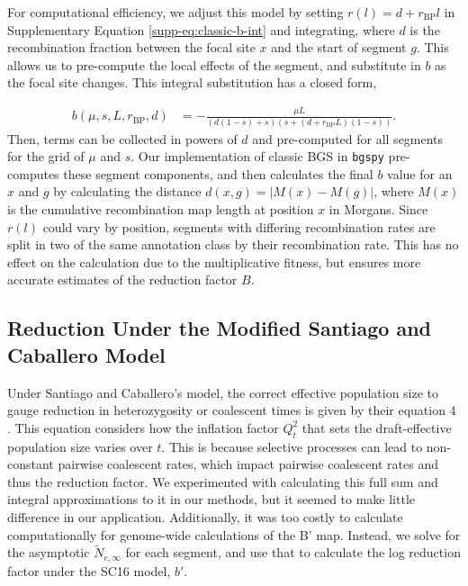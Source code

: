 \documentclass[11pt]{article}
\begin{document}
For computational efficiency, we adjust this model by setting $r(l) = d +
r_\text{BP} l$ in Supplementary Equation \eqref{supp-eq:classic-b-int} and
integrating, where $d$ is the recombination fraction between the focal site $x$
and the start of segment $g$. This allows us to pre-compute the local effects
of the segment, and substitute in $b$ as the focal site changes. This integral
substitution has a closed form,

\begin{align}
  b(\mu, s, L, r_\text{BP}, d) &= - \frac{\mu L}{(d(1-s) + s)(s + (d + r_\text{BP}L)(1-s))}.
\end{align}
%
Then, terms can be collected in powers of $d$ and pre-computed for all segments for
the grid of $\mu$ and $s$. Our implementation of classic BGS in \texttt{bgspy}
pre-computes these segment components, and then calculates the final $b$ value
for an $x$ and $g$ by calculating the distance $d(x,g) = |M(x) - M(g)|$, where
$M(x)$ is the cumulative recombination map length at position $x$ in Morgans.
Since $r(l)$ could vary by position, segments with differing recombination
rates are split in two of the same annotation class by their recombination
rate. This has no effect on the calculation due to the multiplicative fitness,
but ensures more accurate estimates of the reduction factor $B$.


\subsection{Reduction Under the Modified Santiago and Caballero Model}
\label{supp:reduction-sc16}

Under Santiago and Caballero's model, the correct effective population size to
gauge reduction in heterozygosity or coalescent times is given by their
equation 4 \parencite{Santiago2016-mu}. This equation considers how the
inflation factor $Q_t^2$ that sets the draft-effective population size varies
over $t$. This is because selective processes can lead to non-constant pairwise
coalescent rates, which impact pairwise coalescent rates and thus the reduction
factor. We experimented with calculating this full sum and integral
approximations to it in our methods, but it seemed to make little difference in
our application. Additionally, it was too costly to calculate computationally
for genome-wide calculations of the B' map. Instead, we solve for the
asymptotic $\widetilde{N}_{e,\infty}$ for each segment, and use that to
calculate the log reduction factor under the SC16 model, $b'$.
\end{document}
